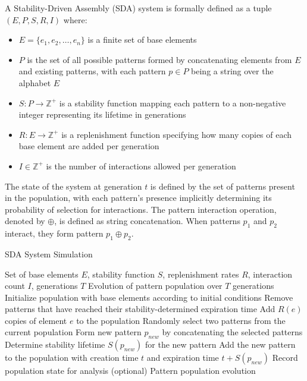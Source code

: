 \documentclass[preprint,12pt]{elsarticle}
\begin{document}
A Stability-Driven Assembly (SDA) system is formally defined as a tuple $(E, P, S, R, I)$ where:
\begin{itemize}
   \item $E = \{e_1, e_2, \ldots, e_n\}$ is a finite set of base elements
   \item $P$ is the set of all possible patterns formed by concatenating elements from $E$ and existing patterns, with each pattern $p \in P$ being a string over the alphabet $E$
   \item $S: P \rightarrow \mathbb{Z}^{+}$ is a stability function mapping each pattern to a non-negative integer representing its lifetime in generations
   \item $R: E \rightarrow \mathbb{Z}^{+}$ is a replenishment function specifying how many copies of each base element are added per generation
   \item $I \in \mathbb{Z}^{+}$ is the number of interactions allowed per generation
\end{itemize}

The state of the system at generation $t$ is defined by the set of patterns present in the population, with each pattern's presence implicitly determining its probability of selection for interactions. The pattern interaction operation, denoted by $\oplus$, is defined as string concatenation. When patterns $p_1$ and $p_2$ interact, they form pattern $p_1 \oplus p_2$.


\begin{algorithm}[H]
\caption{SDA System Simulation}
\begin{algorithmic}[1]
\REQUIRE Set of base elements $E$, stability function $S$, replenishment rates $R$, interaction count $I$, generations $T$
\ENSURE Evolution of pattern population over $T$ generations
\STATE Initialize population with base elements according to initial conditions
   \STATE Remove patterns that have reached their stability-determined expiration time
       \STATE Add $R(e)$ copies of element $e$ to the population
   \ENDFOR
       \STATE Randomly select two patterns from the current population
       \STATE Form new pattern $p_{new}$ by concatenating the selected patterns
       \STATE Determine stability lifetime $S(p_{new})$ for the new pattern
       \STATE Add the new pattern to the population with creation time $t$ and expiration time $t + S(p_{new})$
   \ENDFOR
   \STATE Record population state for analysis (optional)
\ENDFOR
\RETURN Pattern population evolution
\end{algorithmic}
\end{algorithm}
\end{document}
